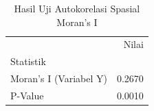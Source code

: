 \begin{table}[H]
\centering
\caption{Hasil Uji Autokorelasi Spasial Moran's I}
\label{tab:moran_result}
\footnotesize
\begin{tabular}{lr}
\toprule
 & Nilai \\
Statistik &  \\
\midrule
Moran's I (Variabel Y) & 0.2670 \\
P-Value & 0.0010 \\
\bottomrule
\end{tabular}
\end{table}
